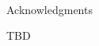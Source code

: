 \thispagestyle{plain}
\hbox{\ }
\vspace{0.5in}

\begin{center}
\large{Acknowledgments}
\end{center}

\vspace{1ex}
TBD